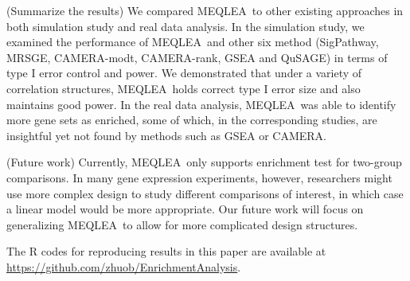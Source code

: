 \documentclass[useAMS,usenatbib, galley]{biom}
\newcommand{\OurMethod}{MEQLEA}
\newcommand{\CMR}{CAMERA-rank}
\newcommand{\CMT}{CAMERA-modt}
\newcommand{\gent}{SigPathway}
\begin{document}
	(Summarize the results) We compared \OurMethod~to other existing approaches in both simulation study and real data analysis. In the simulation study, we examined the performance of \OurMethod~and other six method (\gent, MRSGE, \CMT, \CMR, GSEA and QuSAGE) in terms of type I error control and power. We demonstrated that under a variety of correlation structures, \OurMethod~holds correct type I error size and also maintains good power. In the real data analysis, \OurMethod~was able to identify more gene sets as enriched, some of which, in the corresponding studies, are insightful yet not found by methods such as GSEA or CAMERA.  
	
	(Future work) Currently, \OurMethod~only supports enrichment test for two-group comparisons. In many gene expression experiments, however, researchers might use more complex design to study different comparisons of interest, in which case a linear model would be more appropriate. Our future work will focus on generalizing \OurMethod~to allow for more complicated design structures. 
	
	The R codes for reproducing results in this paper are available at \url{https://github.com/zhuob/EnrichmentAnalysis}.
	
\end{document}
